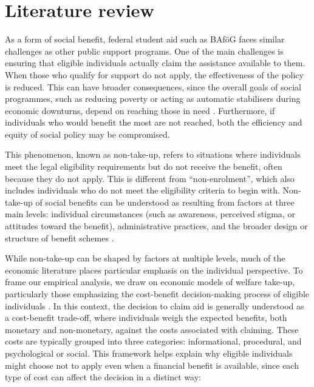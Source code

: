 \section{Literature review}

As a form of social benefit, federal student aid such as BAföG faces similar challenges as other public support programs. 
One of the main challenges is ensuring that eligible individuals actually claim the assistance available to them. 
When those who qualify for support do not apply, the effectiveness of the policy is reduced. 
This can have broader consequences, since the overall goals of social programmes, such as reducing poverty or acting as automatic stabilisers during economic downturns, depend on reaching those in need \citep{goedeme_concept_2020}. 
Furthermore, if individuals who would benefit the most are not reached, both the efficiency and equity of social policy may be compromised.

This phenomenon, known as non-take-up, refers to situations where individuals meet the legal eligibility requirements but do not receive the benefit, often because they do not apply. 
This is different from “non-enrolment”, which also includes individuals who do not meet the eligibility criteria to begin with. Non-take-up of social benefits can be understood as resulting from factors at three main levels: individual circumstances (such as awareness, perceived stigma, or attitudes toward the benefit), administrative practices, and the broader design or structure of benefit schemes \citep{vanoorschot_failing_2002}. 

While non-take-up can be shaped by factors at multiple levels, much of the economic literature places particular emphasis on the individual perspective. To frame our empirical analysis, we draw on economic models of welfare take-up, particularly those emphasizing the cost-benefit decision-making process of eligible individuals \citep{vanoorschot_failing_2002, booij_role_2012}. In this context, the decision to claim aid is generally understood as a cost-benefit trade-off, where individuals weigh the expected benefits, both monetary and non-monetary, against the costs associated with claiming. These costs are typically grouped into three categories: informational, procedural, and psychological or social. This framework helps explain why eligible individuals might choose not to apply even when a financial benefit is available, since each type of cost can affect the decision in a distinct way:

